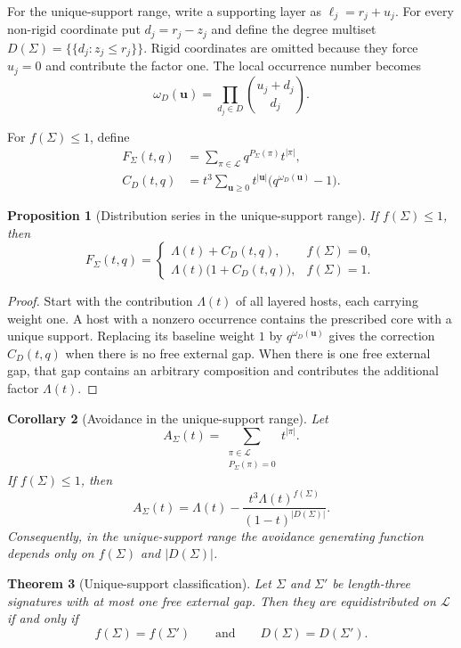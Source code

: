\documentclass[12pt]{article}
\newtheorem{thm}{Theorem}[section]
\newtheorem{prop}[thm]{Proposition}
\newtheorem{coro}[thm]{Corollary}
\newcommand{\cL}{\mathcal L}
\begin{document}
For the unique-support range, write a supporting layer as
$\ell_j=r_j+u_j$.  For every non-rigid coordinate put $d_j=r_j-z_j$ and
define the degree multiset
$D(\Sigma)=\{\!\{d_j:z_j\le r_j\}\!\}$.  Rigid coordinates are omitted
because they force $u_j=0$ and contribute the factor one.  The local occurrence number becomes
\[
\omega_D(\mathbf u)=
\prod_{d_j\in D}\binom{u_j+d_j}{d_j}.
\]

For $f(\Sigma)\le1$, define
\[
\begin{aligned}
F_\Sigma(t,q)
&=
\sum_{\pi\in\cL}q^{P_\Sigma(\pi)}t^{|\pi|},\\
C_D(t,q)
&=
t^3\sum_{\mathbf u\ge0}
t^{|\mathbf u|}
\bigl(q^{\omega_D(\mathbf u)}-1\bigr).
\end{aligned}
\]

\begin{prop}[Distribution series in the unique-support range]
\label{prop:unique-support-series}
If $f(\Sigma)\le1$, then
\[
F_\Sigma(t,q)
=
\begin{cases}
\Lambda(t)+C_D(t,q),&f(\Sigma)=0,\\[1mm]
\Lambda(t)\bigl(1+C_D(t,q)\bigr),&f(\Sigma)=1.
\end{cases}
\]
\end{prop}

\begin{proof}
Start with the contribution $\Lambda(t)$ of all layered hosts, each carrying
weight one.  A host with a nonzero occurrence contains the prescribed core
with a unique support.  Replacing its baseline weight $1$ by
$q^{\omega_D(\mathbf u)}$ gives the correction $C_D(t,q)$ when there is no
free external gap.  When there is one free external gap, that gap contains an
arbitrary composition and contributes the additional factor $\Lambda(t)$.
\end{proof}

\begin{coro}[Avoidance in the unique-support range]
\label{coro:unique-support-avoidance}
Let
\[
A_\Sigma(t)
=
\sum_{\substack{\pi\in\cL\\P_\Sigma(\pi)=0}}t^{|\pi|}.
\]
If $f(\Sigma)\le1$, then
\[
A_\Sigma(t)
=
\Lambda(t)
-
\frac{t^3\Lambda(t)^{f(\Sigma)}}
     {(1-t)^{|D(\Sigma)|}}.
\]
Consequently, in the unique-support range the avoidance generating function
depends only on $f(\Sigma)$ and $|D(\Sigma)|$.
\end{coro}

\begin{thm}[Unique-support classification]\label{thm:degree-complete}
Let $\Sigma$ and $\Sigma'$ be length-three signatures with at most one free
external gap.  Then they are equidistributed on $\cL$ if and only if
\[
f(\Sigma)=f(\Sigma')
\qquad\text{and}\qquad
D(\Sigma)=D(\Sigma').
\]
\end{thm}
\end{document}
